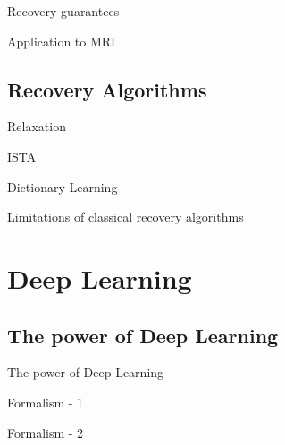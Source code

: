\documentclass[aspectratio=169,xcolor=dvipsnames]{beamer}
\begin{document}
\begin{frame}{Recovery guarantees}
\end{frame}

\begin{frame}{Application to MRI}

\end{frame}

\subsection{Recovery Algorithms}
\begin{frame}{Relaxation}

\end{frame}

\begin{frame}{ISTA}

\end{frame}

\begin{frame}{Dictionary Learning}

\end{frame}


\begin{frame}{Limitations of classical recovery algorithms}
\end{frame}

\section{Deep Learning}

\subsection{The power of Deep Learning}
\begin{frame}{The power of Deep Learning}
\end{frame}

\begin{frame}{Formalism - 1}
\end{frame}

\begin{frame}{Formalism - 2}
\end{frame}
\end{document}
